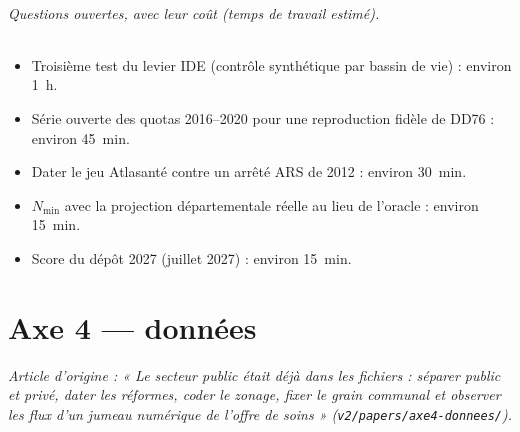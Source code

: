 \paragraph{Questions ouvertes, avec leur coût (temps de travail estimé).}
\begin{itemize}
  \item Troisième test du levier IDE (contrôle synthétique par bassin de vie) : environ 1~h.
  \item Série ouverte des quotas 2016--2020 pour une reproduction fidèle de DD76 : environ 45~min.
  \item Dater le jeu Atlasanté contre un arrêté ARS de 2012 : environ 30~min.
  \item $N_{\min}$ avec la projection départementale réelle au lieu de l'oracle : environ 15~min.
  \item Score du dépôt 2027 (juillet 2027) : environ 15~min.
\end{itemize}



\part{Axe 4 --- données}
\noindent\textit{Article d'origine : « Le secteur public était déjà dans les fichiers : séparer public et privé, dater les réformes, coder le zonage, fixer le grain communal et observer les flux d'un jumeau numérique de l'offre de soins » (\texttt{v2/papers/axe4-donnees/}).}

